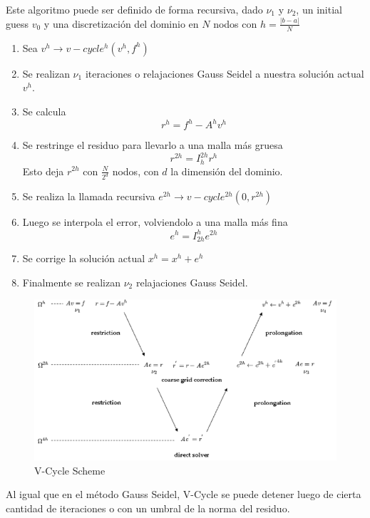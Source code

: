 \documentclass[letter, 10pt]{article}
\begin{document}
Este algoritmo puede ser definido de forma recursiva, dado $\nu_1$ y $\nu_2$, un initial guess $v_0$ y una discretización del dominio en $N$ nodos con $h = \frac{|b-a|}{N}$ 
\begin{enumerate}
    \item Sea $v^h \rightarrow v-cycle^h(v^h,f^h)$
    \item Se realizan $\nu_1$ iteraciones o relajaciones Gauss Seidel a nuestra solución actual $v^h$.
    \item Se calcula
        \begin{equation}
            r^h = f^h - A^h v^h 
        \end{equation}
    \item Se restringe el residuo para llevarlo a una malla más gruesa
        \begin{equation}
            r^{2h} = I_h^{2h} r^{h} 
        \end{equation}
        Esto deja $r^{2h}$ con $\frac{N}{2^d}$ nodos, con $d$ la dimensión del dominio.
    \item Se realiza la llamada recursiva $e^{2h} \rightarrow v-cycle^{2h}(0,r^{2h})$
    \item Luego se interpola el error, volviendolo a una malla más fina
        \begin{equation}
            e^{h} = I_{2h}^{h} e^{2h} 
        \end{equation}
    \item Se corrige la solución actual $x^h = x^h + e^h$
    \item Finalmente se realizan $\nu_2$ relajaciones Gauss Seidel.
\end{enumerate}

\begin{figure}
    \centering
    \includegraphics[scale=0.4]{vcycle.png}
    \caption{V-Cycle Scheme}
    \label{fig:vcyle}
\end{figure}
Al igual que en el método Gauss Seidel, V-Cycle se puede detener luego de cierta cantidad de iteraciones o con un umbral de la norma del residuo.
\end{document}
